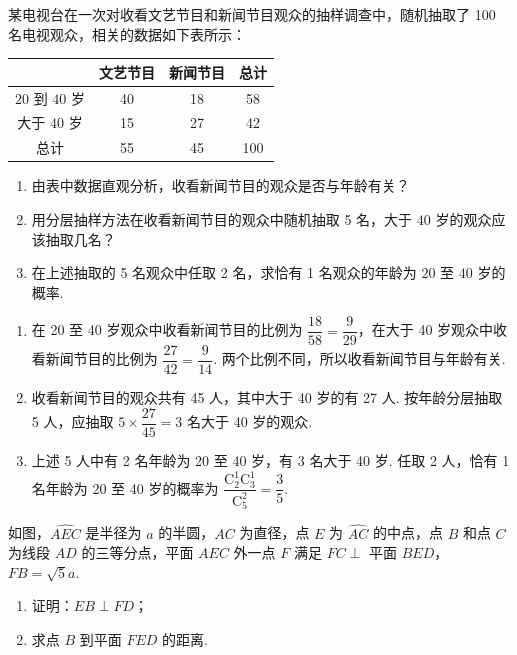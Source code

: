 \begin{problem}
某电视台在一次对收看文艺节目和新闻节目观众的抽样调查中，随机抽取了 100 名电视观众，相关的数据如下表所示：

\begin{center}
\begin{tabular}{c|ccc}
 & 文艺节目 & 新闻节目 & 总计 \\
\hline
\(20\) 到 \(40\) 岁 & 40 & 18 & 58 \\
大于 \(40\) 岁 & 15 & 27 & 42 \\
\hline
总计 & 55 & 45 & 100
\end{tabular}
\end{center}

\begin{enumerate}
\item 由表中数据直观分析，收看新闻节目的观众是否与年龄有关？
\item 用分层抽样方法在收看新闻节目的观众中随机抽取 5 名，大于 \(40\) 岁的观众应该抽取几名？
\item 在上述抽取的 5 名观众中任取 2 名，求恰有 1 名观众的年龄为 \(20\) 至 \(40\) 岁的概率.
\end{enumerate}
\end{problem}

\begin{solution}
\begin{enumerate}
\item 在 20 至 40 岁观众中收看新闻节目的比例为 \(\dfrac{18}{58}=\dfrac9{29}\)，在大于 40 岁观众中收看新闻节目的比例为 \(\dfrac{27}{42}=\dfrac9{14}\). 两个比例不同，所以收看新闻节目与年龄有关.
\item 收看新闻节目的观众共有 45 人，其中大于 40 岁的有 27 人. 按年龄分层抽取 5 人，应抽取 \(5\times\dfrac{27}{45}=3\) 名大于 40 岁的观众.
\item 上述 5 人中有 2 名年龄为 20 至 40 岁，有 3 名大于 40 岁. 任取 2 人，恰有 1 名年龄为 20 至 40 岁的概率为
\(\dfrac{\mathrm C_2^1\mathrm C_3^1}{\mathrm C_5^2}=\dfrac35\).
\end{enumerate}
\end{solution}

\begin{problem}
如图，\(\widehat{AEC}\) 是半径为 \(a\) 的半圆，\(AC\) 为直径，点 \(E\) 为 \(\widehat{AC}\) 的中点，点 \(B\) 和点 \(C\) 为线段 \(AD\) 的三等分点，平面 \(AEC\) 外一点 \(F\) 满足 \(FC \perp\) 平面 \(BED\)，\(FB = \sqrt{5}a\).

\begin{enumerate}
\item 证明：\(EB \perp FD\)；
\item 求点 \(B\) 到平面 \(FED\) 的距离.
\end{enumerate}

\end{problem}

